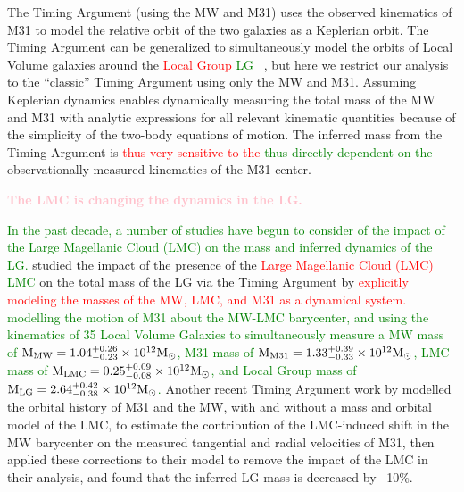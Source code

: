 \documentclass[twocolumn]{aastex631}
\newcommand{\kc}[1]{\textcolor{pink}{\textbf{#1}} }
\newcommand{\remove}[1]{\textcolor{red}{#1}}
\newcommand{\add}[1]{\textcolor{green}{#1}}
\begin{document}
The Timing Argument (using the MW and M31) uses the observed kinematics of M31
to model the relative orbit of the two galaxies as a Keplerian orbit.
The Timing Argument can be generalized to simultaneously model the orbits of
Local Volume galaxies around the \remove{Local Group} \add{LG}
~\citep{Penarrubia2016, Penarrubia2017}, but here we restrict our analysis to
the ``classic'' Timing Argument using only the MW and M31.
Assuming Keplerian dynamics enables dynamically measuring the total mass of the
MW and M31 with analytic expressions for all relevant kinematic quantities
because of the simplicity of the two-body equations of motion.
The inferred mass from the Timing Argument is \remove{thus very sensitive to
the} \add{thus directly dependent on the} observationally-measured kinematics
of the M31 center.

\kc{The LMC  is changing the dynamics in the LG.}

\add{In the past decade, a number of studies have begun to consider of the 
impact of the Large Magellanic Cloud (LMC) on the mass and inferred
dynamics of the LG.}
\citet{Penarrubia2016} studied the impact of the presence of the 
\remove{Large Magellanic Cloud (LMC)}
\add{LMC} on the total mass of the LG via the Timing Argument by
\remove{explicitly modeling the masses of the MW, LMC, and M31 as a dynamical system.}
\add{modelling the motion of M31 about the MW-LMC barycenter, and using the
kinematics of 35 Local Volume Galaxies to simultaneously measure
a MW mass of $\rm M_{MW} = 1.04^{+0.26}_{-0.23}\times 10^{12} M_\odot$, 
M31 mass of $\rm M_{M31} = 1.33^{+0.39}_{-0.33}\times 10^{12} M_\odot$, 
LMC mass of $\rm M_{LMC} = 0.25^{+0.09}_{-0.08}\times 10^{12} M_\odot$,
and Local Group mass of $\rm M_{LG} = 2.64^{+0.42}_{-0.38}\times 10^{12} 
M_\odot$.}
Another recent Timing Argument work by \cite{Benisty2022} modelled the orbital
history of M31 and the MW, with and without a mass and orbital model of the LMC,
to estimate the contribution of the LMC-induced shift in the MW barycenter on
the measured tangential and radial velocities of M31, then applied these
corrections to their model to remove the impact of the LMC in their analysis,
and found that the inferred LG mass is decreased by ~10\%.
\end{document}
